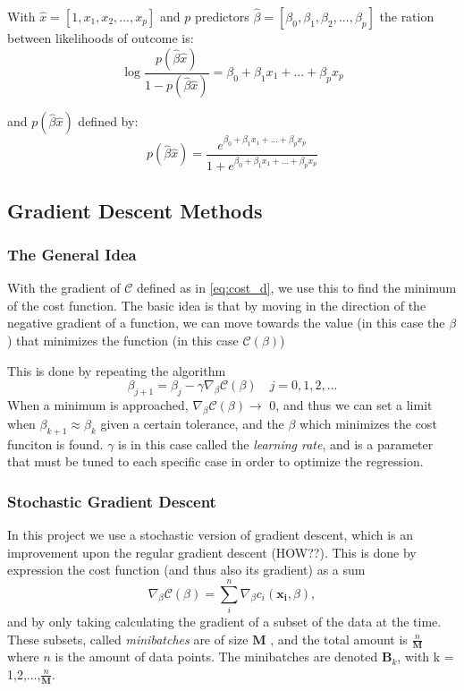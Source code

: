 With $\hat{x} = [1, x_1,x_2,...,x_p]$ and $p$ predictors $\hat{\beta} = [\beta_0,\beta_1,\beta_2,...,\beta_p]$ the ration between likelihoods of outcome is:
\begin{equation}
  \log \frac{p(\hat{\beta}\hat{x})}{1-p(\hat{\beta}\hat{x})} = \beta_0 + \beta_1x_1 + ... + \beta_px_p
  \label{eq:prob_ratio}
\end{equation}

\noindent and $p(\hat{\beta}\hat{x})$ defined by:
\begin{equation}
  p(\hat{\beta}\hat{x}) = \frac{e^{\beta_0 + \beta_1x_1 + ... + \beta_px_p}}{1+e^{\beta_0 + \beta_1x_1 + ... + \beta_px_p}}
  \label{eq:pBx}
\end{equation}

\subsection{Gradient Descent Methods}
\subsubsection*{The General Idea}
With the gradient of $\mathcal{C}$ defined as in \eqref{eq:cost_d}, we use this to find the minimum of the cost function. The basic idea is that by moving in the direction of the negative gradient of a function, we can move towards the value (in this case the $\beta$) that minimizes the function (in this case $\mathcal{C}(\beta)$)

This is done by repeating the algorithm
\begin{equation}
    \beta_{j+1} = \beta_j - \gamma \nabla_\beta \mathcal{C}(\beta) \quad j = 0,1,2,...
    \label{eq:gradient_decent}
\end{equation}
When a minimum is approached, $\nabla_\beta \mathcal{C}(\beta) \rightarrow$ 0, and thus we can set a limit when $\beta_{k+1} \approx \beta_k$ given a certain tolerance, and the $\beta$ which minimizes the cost funciton is found. $\gamma$ is in this case called the \textit{learning rate}, and is a parameter that must be tuned to each specific case in order to optimize the regression.

\subsubsection*{Stochastic Gradient Descent}
In this project we use a stochastic version of gradient descent, which is an improvement upon the regular gradient descent (HOW??). This is done by expression the cost function (and thus also its gradient) as a sum
\begin{equation}
    \nabla_\beta \mathcal{C}(\beta) = \sum_i^n     \nabla_\beta c_i(\boldsymbol{x_i},\beta) ,
    \label{eq:gradient_sum}
\end{equation}
and by only taking calculating the gradient of a subset of the data at the time. These subsets, called \textit{minibatches} are of size $\boldsymbol{M}$ , and the total amount is $\frac{n}{\boldsymbol{M}}$ where $n$ is the amount of data points. The minibatches are denoted $\boldsymbol{B}_k$, with k = 1,2,...,$\frac{n}{\boldsymbol{M}}$.

